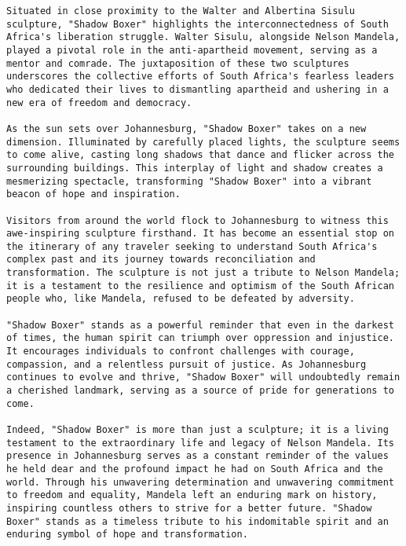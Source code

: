 \begin{lstlisting}
Situated in close proximity to the Walter and Albertina Sisulu sculpture, "Shadow Boxer" highlights the interconnectedness of South Africa's liberation struggle. Walter Sisulu, alongside Nelson Mandela, played a pivotal role in the anti-apartheid movement, serving as a mentor and comrade. The juxtaposition of these two sculptures underscores the collective efforts of South Africa's fearless leaders who dedicated their lives to dismantling apartheid and ushering in a new era of freedom and democracy.

As the sun sets over Johannesburg, "Shadow Boxer" takes on a new dimension. Illuminated by carefully placed lights, the sculpture seems to come alive, casting long shadows that dance and flicker across the surrounding buildings. This interplay of light and shadow creates a mesmerizing spectacle, transforming "Shadow Boxer" into a vibrant beacon of hope and inspiration.

Visitors from around the world flock to Johannesburg to witness this awe-inspiring sculpture firsthand. It has become an essential stop on the itinerary of any traveler seeking to understand South Africa's complex past and its journey towards reconciliation and transformation. The sculpture is not just a tribute to Nelson Mandela; it is a testament to the resilience and optimism of the South African people who, like Mandela, refused to be defeated by adversity.

"Shadow Boxer" stands as a powerful reminder that even in the darkest of times, the human spirit can triumph over oppression and injustice. It encourages individuals to confront challenges with courage, compassion, and a relentless pursuit of justice. As Johannesburg continues to evolve and thrive, "Shadow Boxer" will undoubtedly remain a cherished landmark, serving as a source of pride for generations to come.

Indeed, "Shadow Boxer" is more than just a sculpture; it is a living testament to the extraordinary life and legacy of Nelson Mandela. Its presence in Johannesburg serves as a constant reminder of the values he held dear and the profound impact he had on South Africa and the world. Through his unwavering determination and unwavering commitment to freedom and equality, Mandela left an enduring mark on history, inspiring countless others to strive for a better future. "Shadow Boxer" stands as a timeless tribute to his indomitable spirit and an enduring symbol of hope and transformation.
\end{lstlisting}

